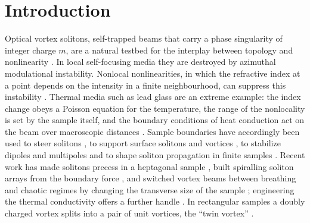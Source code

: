 \hypertarget{introduction}{%
\section{Introduction}\label{introduction}}

Optical vortex solitons, self-trapped beams that carry a phase singularity of integer charge \(m\), are a natural testbed for the interplay between topology and nonlinearity \citep{Desyatnikov2005review}. In local self-focusing media they are destroyed by azimuthal modulational instability. Nonlocal nonlinearities, in which the refractive index at a point depends on the intensity in a finite neighbourhood, can suppress this instability \citep{Malomed2022review, Rotschild2005, Kartashov2007cyl, Zhang2019higher, Shou2021cylvector}. Thermal media such as lead glass are an extreme example: the index change obeys a Poisson equation for the temperature, the range of the nonlocality is set by the sample itself, and the boundary conditions of heat conduction act on the beam over macroscopic distances \citep{Alfassi2007boundary, Alfassi2007surface, Shou2009cylforce}. Sample boundaries have accordingly been used to steer solitons \citep{Ye2009steering, Jiang2010rect, Louis2013nonsym}, to support surface solitons and vortices \citep{Ye2008surface, Kartashov2007surface}, to stabilize dipoles and multipoles \citep{Ye2008dipole, Dong2010multipole} and to shape soliton propagation in finite samples \citep{Liang2008finite, Buccoliero2009boundary}. Recent work has made solitons precess in a heptagonal sample \citep{Chen2025heptagon}, built spiralling soliton arrays from the boundary force \citep{Chen2025spiraling}, and switched vortex beams between breathing and chaotic regimes by changing the transverse size of the sample \citep{Wang2025boundarychaoticon, Li2023adaptive, Wang2022chaoticon}; engineering the thermal conductivity offers a further handle \citep{Kartashov2013thermal}. In rectangular samples a doubly charged vortex splits into a pair of unit vortices, the ``twin vortex'' \citep{Ye2010twin}.

